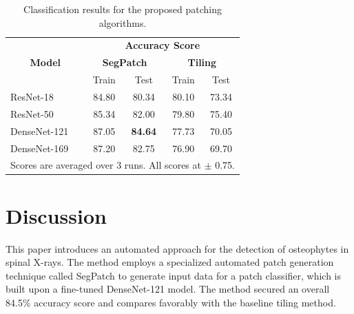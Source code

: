 \documentclass{article}
\newcommand{\soumya}[1]{\textcolor{red}{#1}}
\begin{document}
\begin{table}[]
\centering
\caption{Classification results for the proposed patching algorithms.}
\label{Segpatch_Scores}
\begin{tabular}{|lcccc|}
\hline
\multicolumn{1}{|c|}{\multirow{3}{*}{\textbf{Model}}} & \multicolumn{4}{c|}{\textbf{Accuracy Score}}                                                           \\ \cline{2-5} 
\multicolumn{1}{|c|}{}                                & \multicolumn{2}{c|}{\textbf{SegPatch}}                           & \multicolumn{2}{c|}{\textbf{Tiling}} \\ \cline{2-5} 
\multicolumn{1}{|c|}{}                                & \multicolumn{1}{c|}{Train}          & \multicolumn{1}{c|}{Test}  & \multicolumn{1}{c|}{Train}  & Test   \\ \hline
\multicolumn{1}{|l|}{ResNet-18}                       & \multicolumn{1}{c|}{84.80}           & \multicolumn{1}{c|}{80.34} & \multicolumn{1}{c|}{80.10}     & 73.34  \\ \hline
\multicolumn{1}{|l|}{ResNet-50}                       & \multicolumn{1}{c|}{85.34} & \multicolumn{1}{c|}{82.00}    & \multicolumn{1}{c|}{79.80}   & 75.40   \\ \hline
\multicolumn{1}{|l|}{DenseNet-121}                    & \multicolumn{1}{c|}{87.05}          & \multicolumn{1}{c|}{\textbf{84.64}} & \multicolumn{1}{c|}{77.73}  & 70.05  \\ \hline
\multicolumn{1}{|l|}{DenseNet-169}                    & \multicolumn{1}{c|}{87.20}           & \multicolumn{1}{c|}{82.75} & \multicolumn{1}{c|}{76.90}   & 69.70   \\ \hline
\multicolumn{5}{c}{\small{Scores are averaged over 3 runs. All scores at $\pm$ 0.75.}}                            
\end{tabular}
\end{table}

\section{Discussion}
This paper introduces an automated approach for the detection of osteophytes in spinal X-rays. 
The method employs a specialized automated patch generation technique called SegPatch to generate input data for a patch classifier, which is built upon a fine-tuned DenseNet-121 model. 
The method secured an overall 84.5\% accuracy score and compares favorably with the baseline tiling method.
\end{document}
